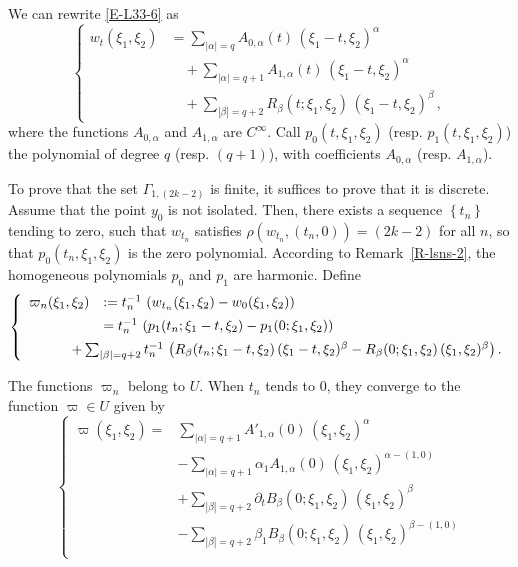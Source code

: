 \documentclass[12pt,a4paper]{amsart}
\theoremstyle{plain} %
\theoremstyle{definition}
\numberwithin{equation}{section}
\numberwithin{figure}{section}
\numberwithin{table}{section}
\newcommand{\set}[1]{\left\lbrace #1 \right\rbrace}
\begin{document}
We can rewrite \eqref{E-L33-6} as
%
\begin{equation}\label{E-L33-8}
\left\{
\begin{array}{ll}
w_t(\xi_1,\xi_2) & = \sum_{|\alpha| = q} A_{0,\alpha}(t) \, \left( \xi_1 - t, \xi_2\right)^{\alpha}\\[5pt]
 &\quad  + \sum_{|\alpha| = q+1} A_{1,\alpha}(t) \, \left( \xi_1 - t, \xi_2\right)^{\alpha}\\[5pt]
& \quad  + \sum_{|\beta| = q+2} R_{\beta}(t;\xi_1,\xi_2)\, \left( \xi_1 - t, \xi_2\right)^{\beta}\,,
\end{array}
\right.
\end{equation}
%
where the functions $A_{0,\alpha}$ and $A_{1,\alpha}$ are $C^{\infty}$. Call $p_0(t,\xi_1,\xi_2)$ (resp. $p_1(t,\xi_1,\xi_2)$) the polynomial of degree $q$ (resp. $(q+1)$), with coefficients $A_{0,\alpha}$ (resp. $A_{1,\alpha}$).\smallskip

To prove that the set $\Gamma_{1,(2k -2)}$ is finite, it suffices to prove that it is discrete. Assume that the point $y_0$ is not isolated. Then, there exists a sequence $\set{t_n}$ tending to zero, such that $w_{t_n}$ satisfies $\rho(w_{t_n},(t_n,0)) = (2k-2)$ for all $n$, so that $p_0(t_n,\xi_1,\xi_2)$ is the zero polynomial.  According to Remark~\ref{R-lsns-2}, the homogeneous polynomials $p_0$ and $p_1$ are harmonic. Define
%
\begin{equation*}%
\left\{
\begin{array}{ll}
\varpi_n(\xi_1,\xi_2) & := t_n^{-1}\, \left( w_{t_n}(\xi_1,\xi_2) - w_{0}(\xi_1,\xi_2)\right)\\[5pt]
 & =  t_n^{-1}\, \left( p_1(t_n;\xi_1-t,\xi_2) - p_1(0;\xi_1,\xi_2)\right) \\[5pt]
& \hspace{-8mm}+ \sum_{|\beta|=q+2}t_n^{-1}\, \left( R_{\beta}(t_n;\xi_1-t,\xi_2)\, (\xi_1-t,\xi_2)^{\beta} - R_{\beta}(0;\xi_1,\xi_2)\,(\xi_1,\xi_2)^{\beta}\right).
\end{array}
\right.
\end{equation*}

The functions $\varpi_n$ belong to $U$. When $t_n$ tends to $0$, they converge to the function $ \varpi \in U$ given by
%
\begin{equation}\label{E-L33-12}
\left\{
\begin{array}{ll}
\varpi(\xi_1,\xi_2) = & \sum_{|\alpha|=q+1} A'_{1,\alpha}(0) \, (\xi_1,\xi_2)^{\alpha}\\[5pt]
 &- \sum_{|\alpha|=q+1} \alpha_1 A_{1,\alpha}(0) \, (\xi_1,\xi_2)^{\alpha -(1,0)}\\[5pt]
&+ \sum_{|\beta|=q+2} \partial_t B_{\beta}(0;\xi_1,\xi_2)\, (\xi_1,\xi_2)^{\beta}\\[5pt]
&- \sum_{|\beta|=q+2} \beta_1 B_{\beta}(0;\xi_1,\xi_2)\,
(\xi_1,\xi_2)^{\beta - (1,0)}\\[5pt]
\end{array}
\right.
\end{equation}
\end{document}
